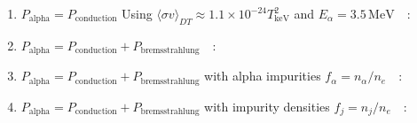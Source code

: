 \begin{enumerate}

   \item{$P_\mathrm{alpha} = P_\mathrm{conduction}$ 
    Using $\langle\sigma v\rangle_{DT} \approx 1.1\times10^{-24}T_\mathrm{keV}^2$
    and $E_\alpha = 3.5 \,\mathrm{MeV}$~~\cite{authors}:
    }

  \item{$P_\mathrm{alpha} = P_\mathrm{conduction} + P_\mathrm{bremsstrahlung}$~~\cite{authors}: 
     }

  \item{$P_\mathrm{alpha} = P_\mathrm{conduction} + P_\mathrm{bremsstrahlung}$ with alpha impurities $f_\alpha = n_\alpha/n_e$~~\cite{authors}: 
    }

  \item{$P_\mathrm{alpha} = P_\mathrm{conduction} + P_\mathrm{bremsstrahlung}$ with impurity densities $f_j = n_j/n_e$~~\cite{authors}:
    }

\end{enumerate}
